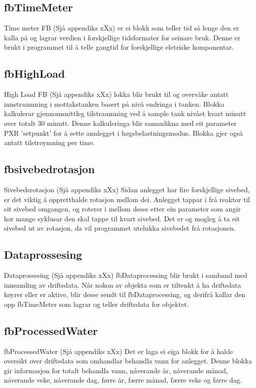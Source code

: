\subsection{fbTimeMeter}
Time meter \gls{FB} (Sjå appendiks xXx) er ei blokk som teller tid så lenge den er kalla på og lagrar verdien i forskjellige tidsformater for seinare bruk.
Denne er brukt i programmet til å telle gangtid for forskjellige eletriske komponentar.

\subsection{fbHighLoad}
High Load \gls{FB} (Sjå appendiks xXx) lokka blir brukt til og overvåke antatt innstraumning i mottakstanken basert på nivå endringa i tanken. 
Blokka kalkulerar gjennomsnittleg tilstraumning ved å sample tank nivået kvart minutt over totalt 30 minutt.
Denne kalkuleringa blir samanlikna med eit parameter PXR 'setpunkt' for å sette annlegget i høgsbelastningsmodus.
Blokka gjer også antatt tilstrøymning per time.

\subsection{fbsivebedrotasjon}
Sivebedsrotasjon (Sjå appendiks xXx)
Sidan anlegget har fire forskjellige sivebed, er det viktig å oppretthalde rotasjon mellom dei. Anlegget tappar i frå reaktor til eit sivebed omgangen, og roterer i mellom desse etter ein parameter som angir kor mange syklusar den skal tappe til kvart sivebed. 
Det er og mogleg å ta eit sivebed ut av rotasjon, da vil programmet utelukka sivebedet frå rotasjonen.

\subsection{Dataprossesing}
Dataprossesing (Sjå appendiks xXx)
fbDataprocessing blir brukt i samband med innsamling av driftsdata. 
Når nokon av objekta som er tiltenkt å ha driftsdata køyrer eller er aktive, blir desse sendt til fbDataprocessing, og derifrå kallar den opp fbTimeMeter som lagrar og teller driftsdata for objektet.

\subsection{fbProcessedWater}
fbProcessedWater (Sjå appendiks xXx)
Det er laga ei eiga blokk for å halde oversikt over driftsdata som omhandlar behandla vann for anlegget. 
Denne blokka gir informasjon for totalt behandla vann, nåverande år, nåverande månad, nåverande veke, nåverande dag, førre år, færre månad, færre veke og førre dag.
